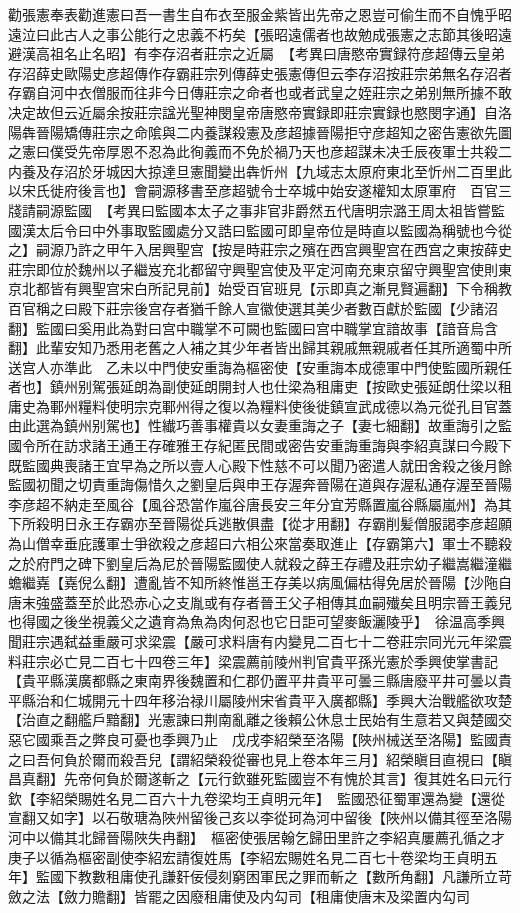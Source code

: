 勸張憲奉表勸進憲曰吾一書生自布衣至服金紫皆出先帝之恩豈可偷生而不自愧乎昭遠泣曰此古人之事公能行之忠義不朽矣【張昭遠儒者也故勉成張憲之志節其後昭遠避漢高祖名止名昭】有李存沼者莊宗之近屬　【考異曰唐愍帝實録符彦超傳云皇弟存沼薛史歐陽史彦超傳作存霸莊宗列傳薛史張憲傳但云李存沼按莊宗弟無名存沼者存霸自河中衣僧服而往非今日傳莊宗之命者也或者武皇之姪莊宗之弟别無所據不敢决定故但云近屬余按莊宗諡光聖神閔皇帝唐愍帝實録即莊宗實録也愍閔字通】自洛陽犇晉陽矯傳莊宗之命隂與二内養謀殺憲及彦超據晉陽拒守彦超知之密告憲欲先圖之憲曰僕受先帝厚恩不忍為此徇義而不免於禍乃天也彦超謀未决壬辰夜軍士共殺二内養及存沼於牙城因大掠達旦憲聞變出犇忻州【九域志太原府東北至忻州二百里此以宋氏徙府後言也】會嗣源移書至彦超號令士卒城中始安遂權知太原軍府　百官三牋請嗣源監國　【考異曰監國本太子之事非官非爵然五代唐明宗潞王周太祖皆嘗監國漢太后令曰中外事取監國處分又誥曰監國可即皇帝位是時直以監國為稱號也今從之】嗣源乃許之甲午入居興聖宫【按是時莊宗之殯在西宫興聖宫在西宫之東按薛史莊宗即位於魏州以子繼岌充北都留守興聖宫使及平定河南充東京留守興聖宫使則東京北都皆有興聖宫宋白所記見前】始受百官班見【示即真之漸見賢遍翻】下令稱教百官稱之曰殿下莊宗後宫存者猶千餘人宣徽使選其美少者數百獻於監國【少諸沼翻】監國曰奚用此為對曰宫中職掌不可闕也監國曰宫中職掌宜諳故事【諳音烏含翻】此輩安知乃悉用老舊之人補之其少年者皆出歸其親戚無親戚者任其所適蜀中所送宫人亦準此　乙未以中門使安重誨為樞密使【安重誨本成德軍中門使監國所親任者也】鎮州别駕張延朗為副使延朗開封人也仕梁為租庸吏【按歐史張延朗仕梁以租庸史為鄆州糧料使明宗克鄆州得之復以為糧料使後徙鎮宣武成德以為元從孔目官蓋由此選為鎮州别駕也】性纎巧善事權貴以女妻重誨之子【妻七細翻】故重誨引之監國令所在訪求諸王通王存確雅王存紀匿民間或密告安重誨重誨與李紹真謀曰今殿下既監國典喪諸王宜早為之所以壹人心殿下性慈不可以聞乃密遣人就田舍殺之後月餘監國初聞之切責重誨傷惜久之劉皇后與申王存渥奔晉陽在道與存渥私通存渥至晉陽李彦超不納走至風谷【風谷恐當作嵐谷唐長安三年分宜芳縣置嵐谷縣屬嵐州】為其下所殺明日永王存霸亦至晉陽從兵逃散俱盡【從才用翻】存霸削髪僧服謁李彦超願為山僧幸垂庇護軍士爭欲殺之彦超曰六相公來當奏取進止【存霸第六】軍士不聽殺之於府門之碑下劉皇后為尼於晉陽監國使人就殺之薛王存禮及莊宗幼子繼嵩繼潼繼蟾繼嶤【嶤倪么翻】遭亂皆不知所終惟邕王存美以病風偏枯得免居於晉陽【沙陁自唐末強盛蓋至於此恐赤心之支胤或有存者晉王父子相傳其血嗣殱矣且明宗晉王義兒也得國之後坐視義父之遺育為魚為肉何忍也它日詎可望麥飯灑陵乎】　徐温高季興聞莊宗遇弑益重嚴可求梁震【嚴可求料唐有内變見二百七十二卷莊宗同光元年梁震料莊宗必亡見二百七十四卷三年】梁震薦前陵州判官貴平孫光憲於季興使掌書記【貴平縣漢廣都縣之東南界後魏置和仁郡仍置平井貴平可曇三縣唐廢平井可曇以貴平縣治和仁城開元十四年移治禄川屬陵州宋省貴平入廣都縣】季興大治戰艦欲攻楚【治直之翻艦戶黯翻】光憲諫曰荆南亂離之後賴公休息士民始有生意若又與楚國交惡它國乘吾之弊良可憂也季興乃止　戊戌李紹榮至洛陽【陜州械送至洛陽】監國責之曰吾何負於爾而殺吾兒【謂紹榮殺從審也見上卷本年三月】紹榮瞋目直視曰【瞋昌真翻】先帝何負於爾遂斬之【元行欽雖死監國豈不有愧於其言】復其姓名曰元行欽【李紹榮賜姓名見二百六十九卷梁均王貞明元年】　監國恐征蜀軍還為變【還從宣翻又如字】以石敬瑭為陜州留後己亥以李從珂為河中留後【陜州以備其徑至洛陽河中以備其北歸晉陽陜失冉翻】　樞密使張居翰乞歸田里許之李紹真屢薦孔循之才庚子以循為樞密副使李紹宏請復姓馬【李紹宏賜姓名見二百七十卷梁均王貞明五年】監國下教數租庸使孔謙姧佞侵刻窮困軍民之罪而斬之【數所角翻】凡謙所立苛斂之法【斂力贍翻】皆罷之因廢租庸使及内勾司【租庸使唐末及梁置内勾司